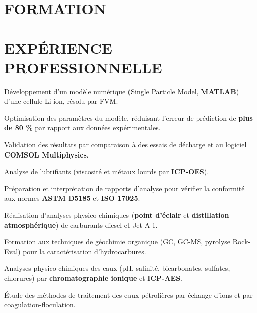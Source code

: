 \documentclass[10pt]{article}
\begin{document}

\section{FORMATION}

\section{EXPÉRIENCE PROFESSIONNELLE}
\begin{bul}
\item Développement d'un modèle numérique (Single Particle Model, \textbf{MATLAB}) d'une cellule Li-ion, résolu par FVM.
\item Optimisation des paramètres du modèle, réduisant l'erreur de prédiction de \textbf{plus de 80 \%} par rapport aux données expérimentales.
\item Validation des résultats par comparaison à des essais de décharge et au logiciel \textbf{COMSOL Multiphysics}.
\end{bul}
\begin{bul}
\item Analyse de lubrifiants (viscosité et métaux lourds par \textbf{ICP-OES}).
\item Préparation et interprétation de rapports d'analyse pour vérifier la conformité aux normes \textbf{ASTM D5185} et \textbf{ISO 17025}.
\end{bul}
\begin{bul}
\item Réalisation d'analyses physico-chimiques (\textbf{point d'éclair} et \textbf{distillation atmosphérique}) de carburants diesel et Jet A-1.
\end{bul}
\begin{bul}
\item Formation aux techniques de géochimie organique (GC, GC-MS, pyrolyse Rock-Eval) pour la caractérisation d'hydrocarbures.
\item Analyses physico-chimiques des eaux (pH, salinité, bicarbonates, sulfates, chlorures) par \textbf{chromatographie ionique} et \textbf{ICP-AES}.
\item Étude des méthodes de traitement des eaux pétrolières par échange d'ions et par coagulation-floculation.
\end{bul}
\end{document}
